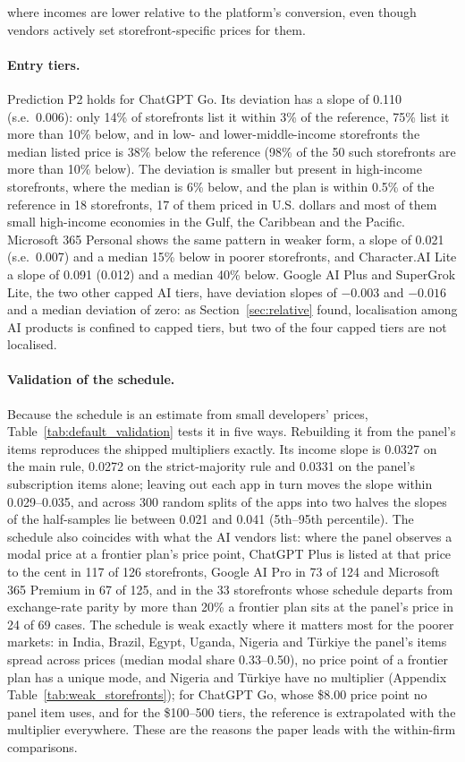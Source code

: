 \documentclass[11pt]{article}
\theoremstyle{definition}
\theoremstyle{remark}
\begin{document}
where incomes are lower relative to the platform's conversion, even though vendors actively set storefront-specific prices for them.

\paragraph{Entry tiers.} Prediction P2 holds for ChatGPT Go. Its deviation has a slope of 0.110 (s.e.\ 0.006): only 14\% of storefronts list it within 3\% of the reference, 75\% list it more than 10\% below, and in low- and lower-middle-income storefronts the median listed price is 38\% below the reference (98\% of the 50 such storefronts are more than 10\% below). The deviation is smaller but present in high-income storefronts, where the median is 6\% below, and the plan is within 0.5\% of the reference in 18 storefronts, 17 of them priced in U.S. dollars and most of them small high-income economies in the Gulf, the Caribbean and the Pacific. Microsoft 365 Personal shows the same pattern in weaker form, a slope of 0.021 (s.e.\ 0.007) and a median 15\% below in poorer storefronts, and Character.AI Lite a slope of 0.091 (0.012) and a median 40\% below. Google AI Plus and SuperGrok Lite, the two other capped AI tiers, have deviation slopes of $-0.003$ and $-0.016$ and a median deviation of zero: as Section~\ref{sec:relative} found, localisation among AI products is confined to capped tiers, but two of the four capped tiers are not localised.

\paragraph{Validation of the schedule.} Because the schedule is an estimate from small developers' prices, Table~\ref{tab:default_validation} tests it in five ways. Rebuilding it from the panel's items reproduces the shipped multipliers exactly. Its income slope is 0.0327 on the main rule, 0.0272 on the strict-majority rule and 0.0331 on the panel's subscription items alone; leaving out each app in turn moves the slope within 0.029--0.035, and across 300 random splits of the apps into two halves the slopes of the half-samples lie between 0.021 and 0.041 (5th--95th percentile). The schedule also coincides with what the AI vendors list: where the panel observes a modal price at a frontier plan's price point, ChatGPT Plus is listed at that price to the cent in 117 of 126 storefronts, Google AI Pro in 73 of 124 and Microsoft 365 Premium in 67 of 125, and in the 33 storefronts whose schedule departs from exchange-rate parity by more than 20\% a frontier plan sits at the panel's price in 24 of 69 cases. The schedule is weak exactly where it matters most for the poorer markets: in India, Brazil, Egypt, Uganda, Nigeria and T\"urkiye the panel's items spread across prices (median modal share 0.33--0.50), no price point of a frontier plan has a unique mode, and Nigeria and T\"urkiye have no multiplier (Appendix Table~\ref{tab:weak_storefronts}); for ChatGPT Go, whose \$8.00 price point no panel item uses, and for the \$100--500 tiers, the reference is extrapolated with the multiplier everywhere. These are the reasons the paper leads with the within-firm comparisons.
\end{document}

